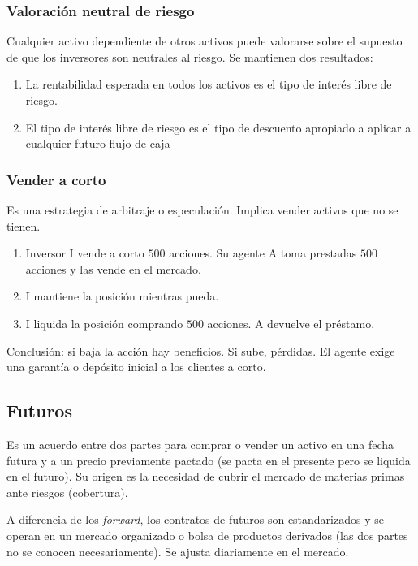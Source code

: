 \documentclass[
10pt, %
a4paper, %
oneside, %
headinclude,footinclude, %
BCOR5mm, %
]{scrartcl}
\newcommand{\cur}[1]{\textit{#1}}
\newcommand{\verde}{\color{verde}}
\newcommand{\f}[1]{{\large{${#1}$}}}
\newcounter{ex}
\newcommand{\ejemplo}{\vspace{0.4cm} {\verde{Ejemplo \arabic{ex}.}}\addtocounter{ex}{1} }
\newcounter{prop}
\begin{document}
		\subsubsection{Valoración neutral de riesgo}

			Cualquier activo dependiente de otros activos puede valorarse sobre el supuesto de que los inversores son neutrales al riesgo. Se mantienen dos resultados:
			\begin{enumerate}
				\item La rentabilidad esperada en todos los activos es el tipo de interés libre de riesgo.
				\item El tipo de interés libre de riesgo es el tipo de descuento apropiado a aplicar a cualquier futuro flujo de caja
			\end{enumerate}

		\subsubsection{Vender a corto}

			Es una estrategia de arbitraje o especulación. Implica vender activos que no se tienen. 

			\ejemplo
			\begin{enumerate}
				\item Inversor I vende a corto \f{500} acciones. Su agente A toma prestadas \f{500} acciones y las vende en el mercado.
				\item I mantiene la posición mientras pueda.
				\item I liquida la posición comprando \f{500} acciones. A devuelve el préstamo.
			\end{enumerate}

			Conclusión: si baja la acción hay beneficios. Si sube, pérdidas. El agente exige una garantía o depósito inicial a los clientes a corto.


		\newpage

	\subsection{Futuros}

		Es un acuerdo entre dos partes para comprar o vender un activo en una fecha futura y a un precio previamente pactado (se pacta en el presente pero se liquida en el futuro). Su origen es la necesidad de cubrir el mercado de materias primas ante riesgos (cobertura).

		A diferencia de los \cur{forward}, los contratos de futuros son estandarizados y se operan en un mercado organizado o bolsa de productos derivados (las dos partes no se conocen necesariamente). Se ajusta diariamente en el mercado.
\end{document}
